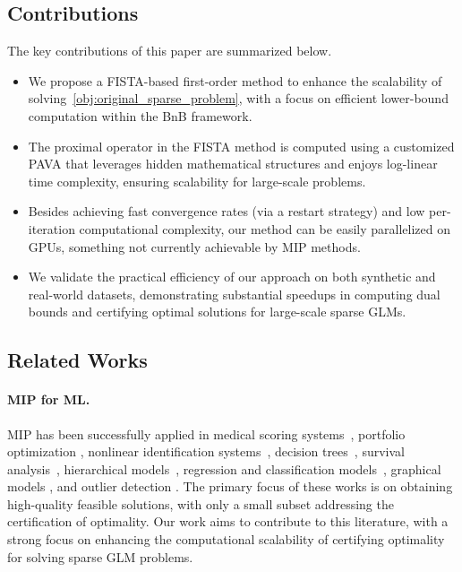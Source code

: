 \subsection{Contributions}
The key contributions of this paper are summarized below.
\begin{itemize}[label=$\diamond$,leftmargin=*]
    \item We propose a FISTA-based first-order method to enhance the scalability of solving~\eqref{obj:original_sparse_problem}, with a focus on efficient lower-bound computation within the BnB framework.
    \item The proximal operator in the FISTA method is computed using a customized PAVA that leverages hidden mathematical structures and enjoys log-linear time complexity, ensuring scalability for large-scale problems.
    \item Besides achieving fast convergence rates (via a restart strategy) and low per-iteration computational complexity, our method can be easily parallelized on GPUs, something not currently achievable by MIP methods.
    \item We validate the practical efficiency of our approach on both synthetic and real-world datasets, demonstrating substantial speedups in computing dual bounds and certifying optimal solutions for large-scale sparse GLMs.
\end{itemize}

\subsection{Related Works}
\label{sec:related_work}

\paragraph{MIP for ML.}
MIP has been successfully applied in
medical scoring systems~\citep{ustun2016supersparse, ustun2019learning, liu2022fasterrisk}, 
portfolio optimization \citep{bienstock1996computational,wei2022convex}, nonlinear identification systems~\citep{bertsimas2023learning, liu2024okridge},
decision trees~\citep{bertsimas2017optimal, hu2019optimal},
survival analysis~\citep{zhang2023optimal, liu2024fastsurvival},
hierarchical models~\citep{bertsimas2020sparse}, regression and classification models~\citep{atamturk2020safe, bertsimas2020sparse, bertsimas2020sparse1, bertsimas2020sparse2, hazimeh2020fast, xie2020scalable, atamturk2021sparse, dedieu2021learning, hazimeh2022sparse, liu2024okridge, guyard2024el0ps}, graphical models \citep{manzour2021integer, kucukyavuz2023consistent}, and outlier detection \citep{gomez2021outlier,gomez2023outlier}.
The primary focus of these works is on obtaining high-quality feasible solutions, with only a small subset addressing the certification of optimality.
Our work aims to contribute to this literature, with a strong focus on enhancing the computational scalability of certifying optimality for solving sparse GLM problems.

